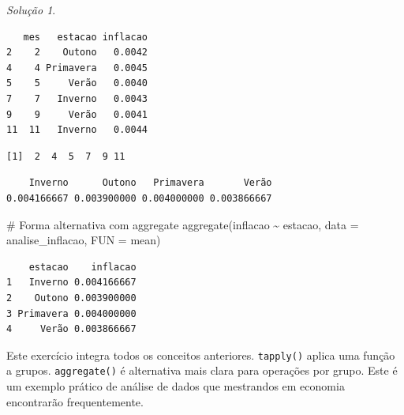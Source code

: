 \documentclass[
  portuguese,
  letterpaper,
  DIV=11,
  numbers=noendperiod]{scrreprt}
\newenvironment{Shaded}{\begin{snugshade}}{\end{snugshade}}
\newcommand{\AttributeTok}[1]{\textcolor[rgb]{0.40,0.45,0.13}{#1}}
\newcommand{\CommentTok}[1]{\textcolor[rgb]{0.37,0.37,0.37}{#1}}
\newcommand{\FunctionTok}[1]{\textcolor[rgb]{0.28,0.35,0.67}{#1}}
\newcommand{\NormalTok}[1]{\textcolor[rgb]{0.00,0.23,0.31}{#1}}
\newcommand{\SpecialCharTok}[1]{\textcolor[rgb]{0.37,0.37,0.37}{#1}}
\theoremstyle{definition}
\theoremstyle{remark}
\newtheorem*{solution}{Solução}
\begin{document}
\begin{solution}
\begin{verbatim}
   mes   estacao inflacao
2    2    Outono   0.0042
4    4 Primavera   0.0045
5    5     Verão   0.0040
7    7   Inverno   0.0043
9    9     Verão   0.0041
11  11   Inverno   0.0044
\end{verbatim}

\begin{Shaded}
\end{Shaded}

\begin{verbatim}
[1]  2  4  5  7  9 11
\end{verbatim}

\begin{Shaded}
\end{Shaded}

\begin{verbatim}
    Inverno      Outono   Primavera       Verão 
0.004166667 0.003900000 0.004000000 0.003866667 
\end{verbatim}

\begin{Shaded}
\begin{Highlighting}[]
\CommentTok{\# Forma alternativa com aggregate}
\FunctionTok{aggregate}\NormalTok{(inflacao }\SpecialCharTok{\textasciitilde{}}\NormalTok{ estacao, }\AttributeTok{data =}\NormalTok{ analise\_inflacao, }\AttributeTok{FUN =}\NormalTok{ mean)}
\end{Highlighting}
\end{Shaded}

\begin{verbatim}
    estacao    inflacao
1   Inverno 0.004166667
2    Outono 0.003900000
3 Primavera 0.004000000
4     Verão 0.003866667
\end{verbatim}

Este exercício integra todos os conceitos anteriores. \texttt{tapply()}
aplica uma função a grupos. \texttt{aggregate()} é alternativa mais
clara para operações por grupo. Este é um exemplo prático de análise de
dados que mestrandos em economia encontrarão frequentemente.
\end{solution}
\end{document}
